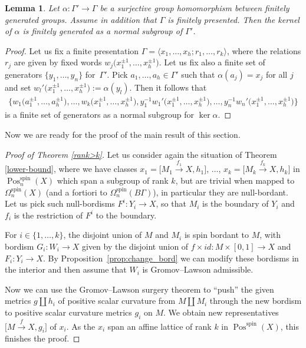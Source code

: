 \documentclass[10pt,a4paper]{amsart}
\numberwithin{equation}{section}
\newtheorem{Lemma}[Theorem]{Lemma}
\newcommand{\disjointunion}{\amalg}
\DeclareMathOperator{\Pos}{Pos}
\DeclareMathOperator{\spin}{spin}
\begin{document}
\begin{Lemma}\label{ker-fg}
 Let $\alpha\colon \Gamma'\to\Gamma$ be a surjective group homomorphism
 between finitely generated groups. Assume in addition that $\Gamma$ is
 finitely presented. Then the kernel of $\alpha$ is finitely generated as a
 \emph{normal} subgroup of $\Gamma'$.
\end{Lemma}
\begin{proof}
 Let us fix a finite presentation $ \Gamma=\langle x_1,\dots, x_h ; r_1, \dots, r_k\rangle $, where the relations $r_j$ are given by fixed words $w_j\big(x_1^{\pm1},\dots, x_h^{\pm1}\big)$. Let us fix also a finite set of generators $\{ y_1,\dots, y_n\}$ for~$\Gamma'$.
 Pick $a_1,\dots,a_h\in\Gamma'$ such that $\alpha(a_j)=x_j$ for all $j$ and set
 $w_l'\big(x_1^{\pm1},\dots, x_h^{\pm1}\big):=\alpha(y_l)$. Then it follows
 that \begin{gather*}\big\{w_1\big(a_1^{\pm1},\dots, a_h^{\pm1}\big),\dots, w_k\big(x_1^{\pm1},\dots,
 x_h^{\pm1}\big),y^{-1}_1w_1'\big(x_1^{\pm1},\dots, x_h^{\pm1}\big), \dots,
 y^{-1}_nw_n'\big(x_1^{\pm1},\dots, x_h^{\pm1}\big)\!\big\}\end{gather*}
 is a finite set of generators
 as a normal subgroup for $\ker \alpha$.
\end{proof}

Now we are ready for the proof of the main result of this section.

\begin{proof}[Proof of Theorem \ref{rank>k}]
 Let us consider again the situation of Theorem \ref{lower-bound}, where we have
 classes $x_1=\big[M_1\xrightarrow{f_1}X,h_1\big]$,
 $\dots$, $x_k=\big[M_k\xrightarrow{f_k}X,h_k\big]$ in $\Pos^{\spin}_{n}(X)$ which span a subgroup of rank $k$,
 but are trivial when mapped to $\Omega^{\spin}_n(X)$ (and a fortiori to $\Omega^{\spin}_n(B\Gamma)$), in particular they are null-bordant.
 Let us pick such null-bordisms $F^i\colon Y_i\to X$, so that $M_i$ is the boundary of $Y_i$ and $f_i$ is the restriction of $F^i$ to the boundary.

 For $i\in\{1,\dots,k\}$, the disjoint union of $M$ and $M_i$ is spin bordant to $M$, with bordism $ G_i\colon W_i\to X$
 given by the disjoint union of $f\times id\colon M\times [0,1]\to X$ and
 $F_i\colon Y_i\to X$. By Proposition~\ref{prop:change_bord} we can modify
 these bordisms in the interior and then assume that
 $W_i$ is Gromov--Lawson admissible.

Now we can use the Gromov--Lawson surgery theorem
 to ``push'' the given metrics $g\disjointunion h_i$ of positive scalar curvature
 from $M\disjointunion M_i$ through the new
 bordism to positive scalar curvature metrics $g_i$ on $M$. We obtain new
 representatives $\big[M\xrightarrow{f} X, g_i\big]$ of $x_i$. As the $x_i$ span an
 affine lattice of rank $k$ in $\Pos^{\spin}(X)$, this finishes the
 proof.
\end{proof}
\end{document}

